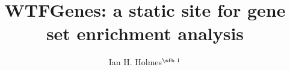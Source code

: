 \documentclass{bioinfo}
\begin{document}

\newcommand\structabs[5]{
\abstract{
{\bf Motivation.}
#1
{\bf Results.}
#2
{\bf Availability and Implementation.}
#3
{\bf Contact.}
#4
{\bf Supplementary Information.}
#5
}
\maketitle
}

\title[WTFGenes]{WTFGenes: a static site for gene set enrichment analysis}
\author[Ian H. Holmes]{Ian H. Holmes$^{\text{\sfb 1}}$}
\address{$^{\text{\sf 1}}$Department of Bioengineering, University of California, Berkeley, CA 94720, USA}

\corresp{}

\history{}

\editor{}


\end{document}
